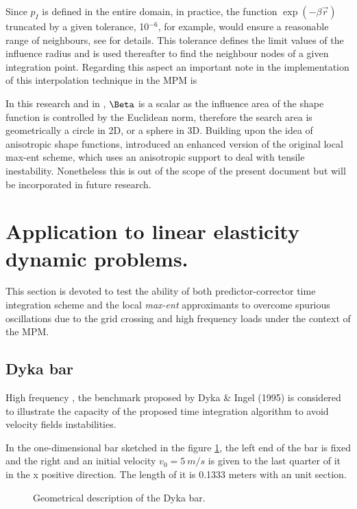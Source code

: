 Since  $p_I$  is defined in the entire domain, in practice, the
function $\exp(-\beta \vec{r} )$ truncated  by  a given tolerance,
10$^{-6}$, for example,  would ensure a reasonable range of
neighbours, see \cite{Arroyo2006} for details. This tolerance defines
the limit values of the influence radius and is used thereafter to
find the neighbour nodes of a given integration point. Regarding this
aspect an important note in the implementation of this interpolation
technique in the MPM is 

In this research and in \cite{Arroyo2006}, $\Beta$ is a scalar as the
influence area of the shape function is controlled by the Euclidean
norm, therefore the search area is geometrically a circle in 2D, or a
sphere in 3D. Building upon the idea of anisotropic shape functions,
\cite{Kochmann2019} introduced an enhanced version of the original
local max-ent scheme, which uses an anisotropic support to deal with
tensile inestability. Nonetheless this is out of the scope of the
present document but will be incorporated in future research.

\section{Application to linear elasticity dynamic problems.}
\label{sec:Application-linear-elasticity-dynamic-problems}

This section is devoted to test the ability of both predictor-corrector
time integration scheme and the local \textit{max-ent} approximants to
overcome spurious oscillations due to the grid crossing and high
frequency loads under the context of the MPM.

\subsection{Dyka bar}
\label{sec:dyka-bar}

High frequency , the benchmark proposed by Dyka \& Ingel
(1995)\cite{Dyka1995} is considered to illustrate the
capacity of the proposed time integration algorithm to avoid velocity
fields instabilities.

In the one-dimensional bar sketched in the figure \ref{fig:Dyka_Bar},
the left end of the bar is fixed and the right and an initial velocity
$v_0 = 5\ m/s$ is given to the last quarter of it in the x positive
direction. The length of it is 0.1333 meters with an unit section.

\begin{figure}\sidecaption
  \centering
  \resizebox{\hsize}{!}{
    }
  \caption{Geometrical description of the Dyka \cite{Dyka1995} bar.}
  \label{fig:Dyka_Bar}
\end{figure}

